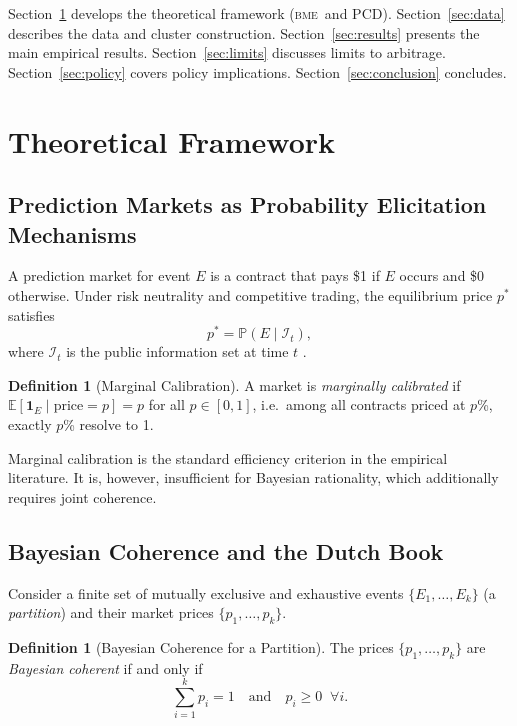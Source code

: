 \documentclass[12pt,a4paper]{article}
\theoremstyle{definition}
\newtheorem{definition}[theorem]{Definition}
\theoremstyle{remark}
\newcommand{\E}{\mathbb{E}}
\newcommand{\Prob}{\mathbb{P}}
\newcommand{\PCD}{\mathrm{PCD}}
\newcommand{\BME}{\textsc{bme}}
\begin{document}
Section~\ref{sec:theory} develops the theoretical framework (\BME\ and $\PCD$).
Section~\ref{sec:data} describes the data and cluster construction.
Section~\ref{sec:results} presents the main empirical results.
Section~\ref{sec:limits} discusses limits to arbitrage.
Section~\ref{sec:policy} covers policy implications.
Section~\ref{sec:conclusion} concludes.

\section{Theoretical Framework}
\label{sec:theory}

\subsection{Prediction Markets as Probability Elicitation Mechanisms}

A prediction market for event $E$ is a contract that pays \$1 if $E$ occurs
and \$0 otherwise.
Under risk neutrality and competitive trading, the equilibrium price $p^*$
satisfies
\begin{equation}
  p^* = \Prob(E \mid \mathcal{I}_t),
  \label{eq:pm_price}
\end{equation}
where $\mathcal{I}_t$ is the public information set at time $t$
\citep{wolfers2004}.

\begin{definition}[Marginal Calibration]
\label{def:calibration}
A market is \emph{marginally calibrated} if
$\E[\mathbf{1}_E \mid \text{price} = p] = p$ for all $p \in [0,1]$,
i.e.\ among all contracts priced at $p$\%, exactly $p$\% resolve to 1.
\end{definition}

Marginal calibration is the standard efficiency criterion in the empirical
literature.
It is, however, insufficient for Bayesian rationality, which additionally
requires joint coherence.

\subsection{Bayesian Coherence and the Dutch Book}

Consider a finite set of mutually exclusive and exhaustive events
$\{E_1, \ldots, E_k\}$ (a \emph{partition}) and their market prices
$\{p_1, \ldots, p_k\}$.

\begin{definition}[Bayesian Coherence for a Partition]
\label{def:coherence}
The prices $\{p_1,\ldots,p_k\}$ are \emph{Bayesian coherent} if and only if
\begin{equation}
  \sum_{i=1}^{k} p_i = 1 \quad \text{and} \quad p_i \geq 0 \;\; \forall i.
  \label{eq:coherence}
\end{equation}
\end{definition}
\end{document}
